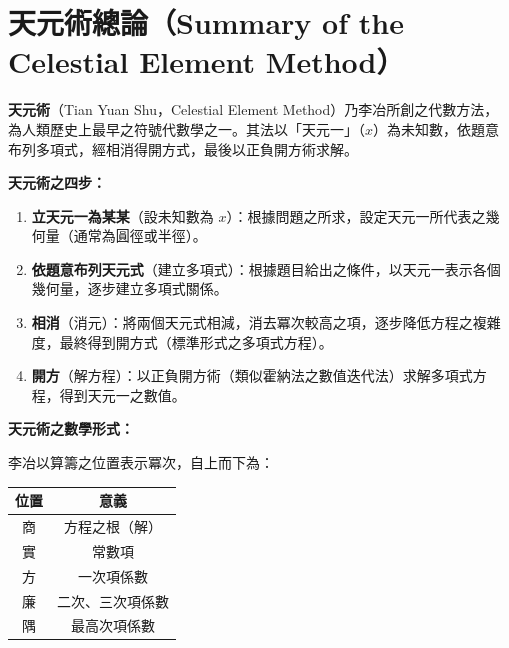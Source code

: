 \documentclass[11pt,a4paper]{article}
\begin{document}
\section*{天元術總論（Summary of the Celestial Element Method）}

\begin{framed}
\noindent\textbf{天元術}（Tian Yuan Shu，Celestial Element Method）乃李冶所創之代數方法，為人類歷史上最早之符號代數學之一。其法以「天元一」（$x$）為未知數，依題意布列多項式，經相消得開方式，最後以正負開方術求解。
\end{framed}

\vspace{0.3cm}

\textbf{天元術之四步：}

\begin{enumerate}[leftmargin=2em]
  \item \textbf{立天元一為某某}（設未知數為 $x$）：根據問題之所求，設定天元一所代表之幾何量（通常為圓徑或半徑）。

  \item \textbf{依題意布列天元式}（建立多項式）：根據題目給出之條件，以天元一表示各個幾何量，逐步建立多項式關係。

  \item \textbf{相消}（消元）：將兩個天元式相減，消去冪次較高之項，逐步降低方程之複雜度，最終得到開方式（標準形式之多項式方程）。

  \item \textbf{開方}（解方程）：以正負開方術（類似霍納法之數值迭代法）求解多項式方程，得到天元一之數值。
\end{enumerate}

\vspace{0.3cm}

\textbf{天元術之數學形式：}

李冶以算籌之位置表示冪次，自上而下為：
\begin{center}
\begin{tabular}{c|c}
\textbf{位置} & \textbf{意義} \\
\hline
商 & 方程之根（解） \\
實 & 常數項 \\
方 & 一次項係數 \\
廉 & 二次、三次項係數 \\
隅 & 最高次項係數 \\
\hline
\end{tabular}
\end{center}
\end{document}
